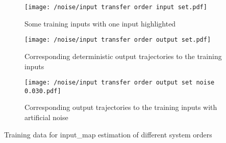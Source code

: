 \begin{example}
\begin{minipage}{1\textwidth}
\begingroup
	\centering
	\vspace{1em}
    \begin{subfigure}[t]{0.32\textwidth}
        \centering\captionsetup{width=.9\linewidth}
        \texttt{[image: /noise/input transfer order input set.pdf]}
        \caption{Some training inputs with one input highlighted}
        \label{subfig:input_tf_order_training_data_in_appex1}
    \end{subfigure}
    \hfill
    \begin{subfigure}[t]{0.32\textwidth}
        \centering\captionsetup{width=.9\linewidth}
        \texttt{[image: /noise/input transfer order output set.pdf]}
        \caption{Corresponding deterministic output trajectories to the training inputs}
        \label{subfig:input_tf_order_training_data_out_appex1}
    \end{subfigure}
    \hfill
    \begin{subfigure}[t]{0.32\textwidth}
        \centering\captionsetup{width=.9\linewidth}
        \texttt{[image: /noise/input transfer order output set noise 0.030.pdf]}
        \caption{Corresponding output trajectories to the training inputs with artificial noise}
        \label{subfig:input_tf_order_training_data_out2_appex1}
    \end{subfigure}
    \caption[System Order of Transfer Maps Example (Training Data)]{Training data for \gls*{input_map} estimation of different system orders}
    \label{fig:input_tf_order_training_data_appex1}
\endgroup
\end{minipage}
\end{example}  
